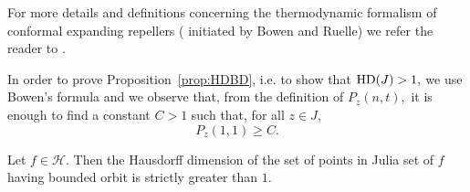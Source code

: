 For more details and definitions concerning the thermodynamic formalism of
conformal expanding repellers ( initiated by Bowen and Ruelle) we refer the
reader to \cite{zinnmeister:thermodynamic}.

In order to prove Proposition~\ref{prop:HDBD}, i.e. to show that ${\mathrm{HD}}(J)
>1,$ we use Bowen's formula and we observe that, from the definition of
$P_z(n,t),$ it is enough to find a constant $C>1$ such that, for all $z\in
J$,
\begin{equation}
  \label{eq:P_t}
  P_z(1,1)\geq C.
\end{equation}

\begin{proposition}\label{prop:HDBD}
  Let $f \in \mathcal{H}$. Then the Hausdorff dimension of the set of points
  in Julia set of $f$ having bounded orbit is strictly greater than $1$.
\end{proposition}

